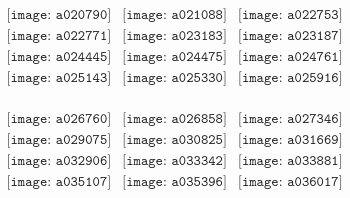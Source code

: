 \documentclass{article}
\begin{document}
        \clearpage
        \begin{figure}[H]
 \begin{center}$
 \begin{array}{cccc}
\texttt{[image: a020790]}&\texttt{[image: a021088]}&\texttt{[image: a022753]}\\\texttt{[image: a022771]}&\texttt{[image: a023183]}&\texttt{[image: a023187]}\\\texttt{[image: a024445]}&\texttt{[image: a024475]}&\texttt{[image: a024761]}\\\texttt{[image: a025143]}&\texttt{[image: a025330]}&\texttt{[image: a025916]}\\
\end{array}$
\end{center}
\end{figure}

\begin{figure}[H]
 \begin{center}$
 \begin{array}{cccc}
\texttt{[image: a026760]}&\texttt{[image: a026858]}&\texttt{[image: a027346]}\\\texttt{[image: a029075]}&\texttt{[image: a030825]}&\texttt{[image: a031669]}\\\texttt{[image: a032906]}&\texttt{[image: a033342]}&\texttt{[image: a033881]}\\\texttt{[image: a035107]}&\texttt{[image: a035396]}&\texttt{[image: a036017]}\\
\end{array}$
\end{center}
\end{figure}
\end{document}
